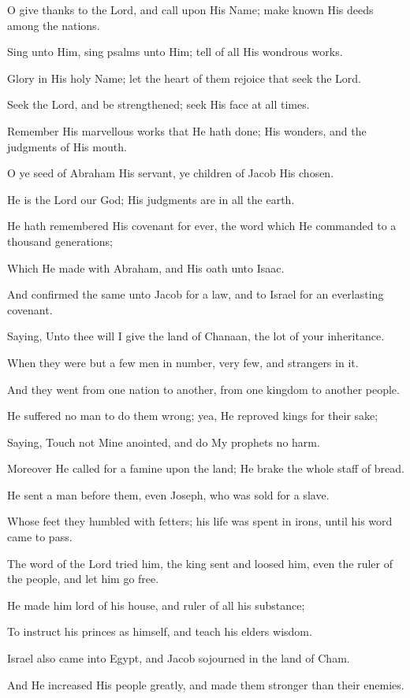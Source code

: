 O give thanks to the Lord, and call upon His Name; make known His deeds among the nations.

Sing unto Him, sing psalms unto Him; tell of all His wondrous works.

Glory in His holy Name; let the heart of them rejoice that seek the Lord.

Seek the Lord, and be strengthened; seek His face at all times.

Remember His marvellous works that He hath done; His wonders, and the judgments of His mouth.

O ye seed of Abraham His servant, ye children of Jacob His chosen.

He is the Lord our God; His judgments are in all the earth.

He hath remembered His covenant for ever, the word which He commanded to a thousand generations;

Which He made with Abraham, and His oath unto Isaac.

And confirmed the same unto Jacob for a law, and to Israel for an everlasting covenant.

Saying, Unto thee will I give the land of Chanaan, the lot of your inheritance.

When they were but a few men in number, very few, and strangers in it.

And they went from one nation to another, from one kingdom to another people.

He suffered no man to do them wrong; yea, He reproved kings for their sake;

Saying, Touch not Mine anointed, and do My prophets no harm.

Moreover He called for a famine upon the land; He brake the whole staff of bread.

He sent a man before them, even Joseph, who was sold for a slave.

Whose feet they humbled with fetters; his life was spent in irons, until his word came to pass.

The word of the Lord tried him, the king sent and loosed him, even the ruler of the people, and let him go free.

He made him lord of his house, and ruler of all his substance;

To instruct his princes as himself, and teach his elders wisdom.

Israel also came into Egypt, and Jacob sojourned in the land of Cham.

And He increased His people greatly, and made them stronger than their enemies.

